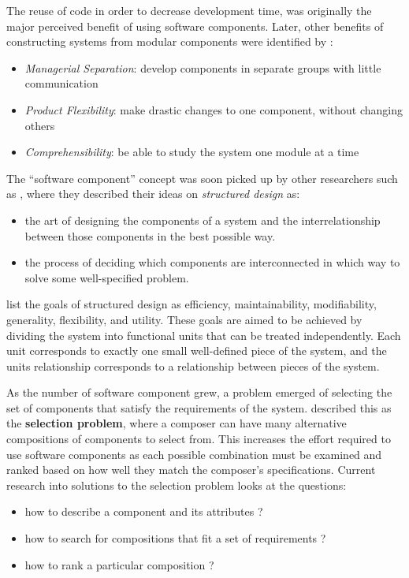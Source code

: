 The reuse of code in order to decrease development time, was originally the major perceived benefit of using software components.
Later, other benefits of constructing systems from modular components were identified by \cite{Parnas1972}:
\begin{itemize}
  \item \textit{Managerial Separation}: develop components in separate groups with little communication
  \item \textit{Product Flexibility}: make drastic changes to one component, without changing others
  \item \textit{Comprehensibility}: be able to study the system one module at a time
\end{itemize}

The ``software component'' concept was soon picked up by other researchers such as \cite{Yourdon1976}, where they described their ideas on \textit{structured design} as:
\begin{itemize}
  \item the art of designing the components of a system and the interrelationship between those components in the best possible way.
  \item the process of deciding which components are interconnected in which way to solve some well-specified problem.
\end{itemize}
\cite{Yourdon1976} list the goals of structured design as efficiency, maintainability, modifiability, generality, flexibility, and utility.
These goals are aimed to be achieved by dividing the system into functional units that can be treated independently.
Each unit corresponds to exactly one small well-defined piece of the system, and the units relationship corresponds to a relationship between pieces of the system.

As the number of software component grew, a problem emerged of selecting the set of components that satisfy the requirements of the system.
\cite{PrietoDiaz1987} described this as the \textbf{selection problem}, where a composer can have many alternative compositions of components to select from.
This increases the effort required to use software components as each possible combination must be examined and ranked based on how well they match the composer's specifications.
Current research into solutions to the selection problem looks at the questions:
\begin{itemize}
  \item how to describe a component and its attributes \citep{treinen2009common,Xinjuan2007}?
  \item how to search for compositions that fit a set of requirements \citep{abate2011,Kwong2010,Treinen2009,DeAlmeida2004}?
  \item how to rank a particular composition \citep{Chen2011,Aleti2009}?
\end{itemize}

